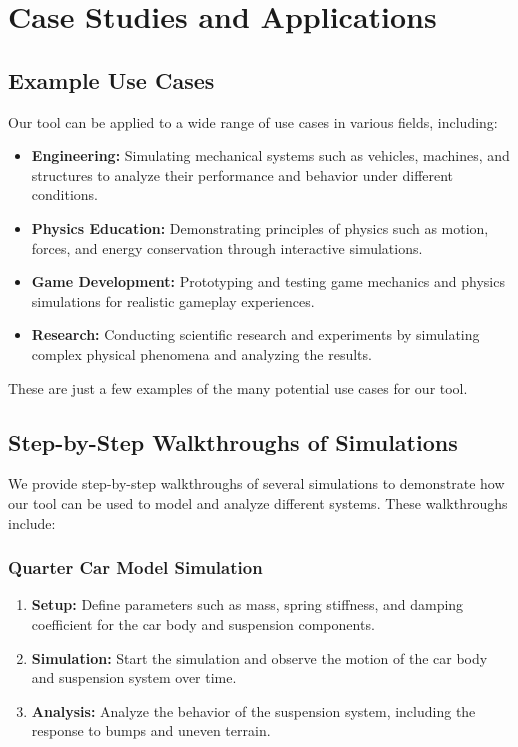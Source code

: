 \chapter{Case Studies and Applications}

\section{Example Use Cases}

Our tool can be applied to a wide range of use cases in various fields, including:

\begin{itemize}
    \item \textbf{Engineering:} Simulating mechanical systems such as vehicles, machines, and structures to analyze their performance and behavior under different conditions.
    \item \textbf{Physics Education:} Demonstrating principles of physics such as motion, forces, and energy conservation through interactive simulations.
    \item \textbf{Game Development:} Prototyping and testing game mechanics and physics simulations for realistic gameplay experiences.
    \item \textbf{Research:} Conducting scientific research and experiments by simulating complex physical phenomena and analyzing the results.
\end{itemize}

These are just a few examples of the many potential use cases for our tool.

\section{Step-by-Step Walkthroughs of Simulations}

We provide step-by-step walkthroughs of several simulations to demonstrate how our tool can be used to model and analyze different systems. These walkthroughs include:

\subsection{Quarter Car Model Simulation}

\begin{enumerate}
    \item \textbf{Setup:} Define parameters such as mass, spring stiffness, and damping coefficient for the car body and suspension components.
    \item \textbf{Simulation:} Start the simulation and observe the motion of the car body and suspension system over time.
    \item \textbf{Analysis:} Analyze the behavior of the suspension system, including the response to bumps and uneven terrain.
\end{enumerate}

